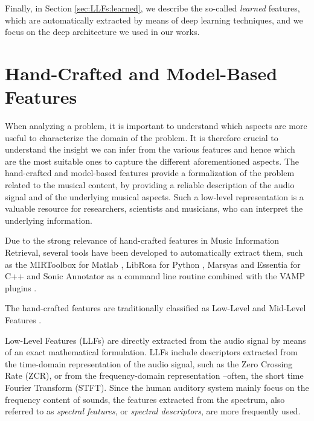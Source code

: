 Finally, in Section \ref{sec:LLFs:learned}, we describe the so-called \textit{learned} features, which are automatically extracted by means of deep learning techniques, and we focus on the deep architecture we used in our works. %


\section{Hand-Crafted and Model-Based Features}\label{sec:LLFs:hand-crafted}
When analyzing a problem, it is important to understand which aspects are more useful to characterize the domain of the problem. It is therefore crucial to understand the insight we can infer from the various features and hence which are the most suitable ones to capture the different aforementioned aspects. The hand-crafted and model-based features provide a formalization of the problem related to the musical content, by providing a reliable description of the audio signal and of the underlying musical aspects. Such a low-level representation is a valuable resource for  researchers, scientists and musicians, who can interpret the underlying information.  

Due to the strong relevance of hand-crafted features in Music Information Retrieval, several tools have been developed to automatically extract them, such as the MIRToolbox for Matlab \cite{Lartillot2007}, LibRosa for Python  \cite{brian_mcfee_2015_18369}, Marsyas \cite{tzanetakis2000marsyas} and Essentia\cite{bogdanov2013essentia} for C++ and Sonic Annotator as a command line routine combined with the VAMP plugins \cite{chris2010a}. 

The hand-crafted features are traditionally classified as Low-Level and Mid-Level Features \cite{Celma2006,Zanoni2013Thesis}.

Low-Level Features (LLFs) are directly extracted from the audio signal by means of an exact mathematical formulation. LLFs include descriptors extracted from the time-domain representation of the audio signal, such as the Zero Crossing Rate (ZCR), or from the frequency-domain representation --often, the short time Fourier Transform (STFT). Since the human auditory system mainly focus on the 
frequency content of sounds, the features extracted from the spectrum, also referred to as \textit{spectral features}, or \textit{spectral descriptors}, are more frequently used. 


